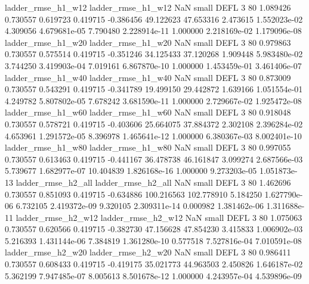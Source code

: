       ladder_rmse_h1_w12       ladder_rmse_h1_w12                   NaN      small     DEFL                 3 80 1.089426       0.730557 0.619723       0.419715   -0.386456     49.122623     47.653316     2.473615   1.552023e-02  4.309056 4.679681e-05     7.790480   2.228914e-11            1.000000    2.218169e-02        1.179096e-08
      ladder_rmse_h1_w20       ladder_rmse_h1_w20                   NaN      small     DEFL                 3 80 0.979863       0.730557 0.575514       0.419715   -0.351246     34.125433     37.120268     1.909448   5.983480e-02  3.744250 3.419903e-04     7.019161   6.867870e-10            1.000000    1.453459e-01        3.461406e-07
      ladder_rmse_h1_w40       ladder_rmse_h1_w40                   NaN      small     DEFL                 3 80 0.873009       0.730557 0.543291       0.419715   -0.341789     19.499150     29.442872     1.639166   1.051554e-01  4.249782 5.807802e-05     7.678242   3.681590e-11            1.000000    2.729667e-02        1.925472e-08
      ladder_rmse_h1_w60       ladder_rmse_h1_w60                   NaN      small     DEFL                 3 80 0.918048       0.730557 0.578721       0.419715   -0.403606     25.664075     37.884372     2.302108   2.396284e-02  4.653961 1.291572e-05     8.396978   1.465641e-12            1.000000    6.380367e-03        8.002401e-10
      ladder_rmse_h1_w80       ladder_rmse_h1_w80                   NaN      small     DEFL                 3 80 0.997055       0.730557 0.613463       0.419715   -0.441167     36.478738     46.161847     3.099274   2.687566e-03  5.739677 1.682977e-07    10.404839   1.826168e-16            1.000000    9.273203e-05        1.051873e-13
      ladder_rmse_h2_all       ladder_rmse_h2_all                   NaN      small     DEFL                 3 80 1.462696       0.730557 0.851093       0.419715   -0.634886    100.216563    102.778910     5.184250   1.627790e-06  6.732105 2.419372e-09     9.320105   2.309311e-14            0.000982    1.381462e-06        1.311688e-11
      ladder_rmse_h2_w12       ladder_rmse_h2_w12                   NaN      small     DEFL                 3 80 1.075063       0.730557 0.620566       0.419715   -0.382730     47.156628     47.854230     3.415833   1.006902e-03  5.216393 1.431144e-06     7.384819   1.361280e-10            0.577518    7.527816e-04        7.010591e-08
      ladder_rmse_h2_w20       ladder_rmse_h2_w20                   NaN      small     DEFL                 3 80 0.986411       0.730557 0.608433       0.419715   -0.419175     35.021773     44.963503     2.450826   1.646187e-02  5.362199 7.947485e-07     8.005613   8.501678e-12            1.000000    4.243957e-04        4.539896e-09
